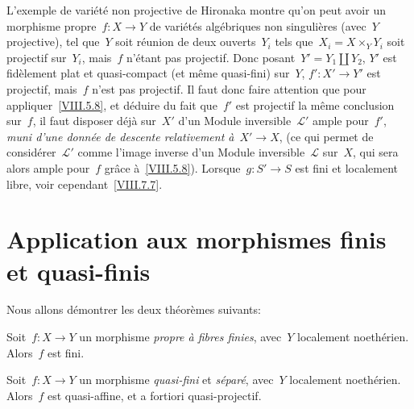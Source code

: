 \begin{remarques}
\label{VIII.5.10}
L'exemple de vari\'et\'e non projective de Hironaka montre qu'on
peut avoir un morphisme propre~$f\colon X\to Y$ de vari\'et\'es
alg\'ebriques non singuli\`eres (avec~$Y$ projective), tel que~$Y$
soit r\'eunion de deux ouverts~$Y_{i}$ tels
que~$X_{i}=X\times_{Y}Y_{i}$ soit projectif sur~$Y_{i}$, mais~$f$
n'\'etant pas projectif. Donc posant~$Y'=Y_{1}\amalg Y_{2}$, $Y'$
est fid\`element plat et quasi-compact (et m\^eme quasi-fini)
sur~$Y$, $f'\colon X'\to Y'$ est projectif, mais~$f$ n'est pas
projectif. Il faut donc faire attention que pour
appliquer~\ref{VIII.5.8}, et d\'eduire du fait que~$f'$ est
projectif la m\^eme conclusion sur~$f$, il faut disposer d\'ej\`a
sur~$X'$ d'un Module inversible~$\mathcal{L}'$ ample pour~$f'$,
\emph{muni d'une donnée de descente relativement à}~$X'\to X$,
(ce qui permet de consid\'erer~$\mathcal{L}'$ comme l'image inverse
d'un Module inversible~$\mathcal{L}$ sur~$X$, qui sera alors ample
pour~$f$ gr\^ace \`a~\ref{VIII.5.8}). Lorsque~$g\colon S'\to S$
est fini et localement libre, voir cependant~\ref{VIII.7.7}.
\end{remarques}

\section[Application aux morphismes finis et quasi-finis]{Application aux morphismes finis et quasi-finis\footnotemark}
\label{VIII.6}

Nous allons d\'emontrer les deux th\'eor\`emes suivants:

\begin{theoreme}
\label{VIII.6.1}
Soit~$f\colon X\to Y$ un morphisme \emph{propre à fibres finies},
avec~$Y$ localement noeth\'erien. Alors~$f$ est fini.
\end{theoreme}

\begin{theoreme}
\label{VIII.6.2}
Soit~$f\colon X\to Y$ un morphisme \emph{quasi-fini} et
\emph{séparé}, avec~$Y$ localement noeth\'erien. Alors~$f$
est quasi-affine, et a fortiori quasi-projectif.
\end{theoreme}

